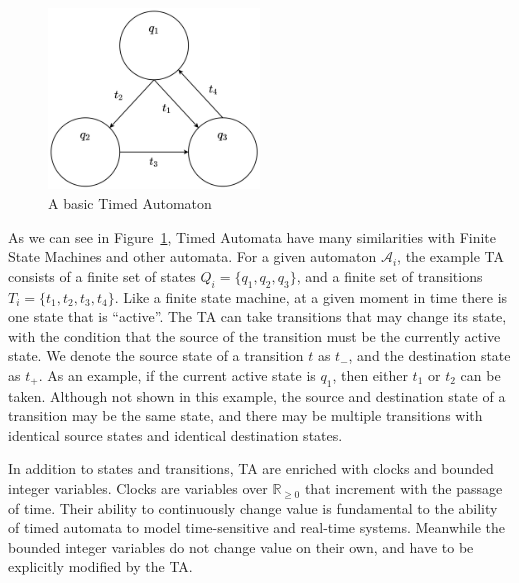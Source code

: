 \documentclass[a4paper,11pt]{report}
\theoremstyle{definition}
\begin{document}
%    
\begin{figure}[h]
  \centering
  \includegraphics[width=0.5\textwidth]{minTA-blank}
  \caption{A basic Timed Automaton}
  \label{fig:example-blank}
\end{figure}

As we can see in Figure~\ref{fig:example-blank}, Timed Automata have many
similarities with Finite State Machines and other automata. For a given
automaton $\mathcal{A}_{i}$, the example TA consists of a finite set of states
$Q_{i} = \{q_{1},q_{2},q_{3}\}$, and a finite set of transitions
$T_{i} = \{t_{1},t_{2},t_{3},t_{4}\}$. Like a finite state machine, at a given
moment in time there is one state that is ``active''. The TA can take
transitions that may change its state, with the condition that the source of the
transition must be the currently active state. We denote the source state of a
transition $t$ as $t_{-}$, and the destination state as $t_{+}$. As an example,
if the current active state is $q_{1}$, then either $t_{1}$ or $t_{2}$ can be
taken. Although not shown in this example, the source and destination state of a
transition may be the same state, and there may be multiple transitions with
identical source states and identical destination states.

In addition to states and transitions, TA are enriched with clocks and bounded
integer variables. Clocks are variables over $\mathbb{R}_{\geq 0}$ that increment with the
passage of time. Their ability to continuously change value is fundamental to
the ability of timed automata to model time-sensitive and real-time systems.
Meanwhile the bounded integer variables do not change value on their own, and
have to be explicitly modified by the TA.
\end{document}
